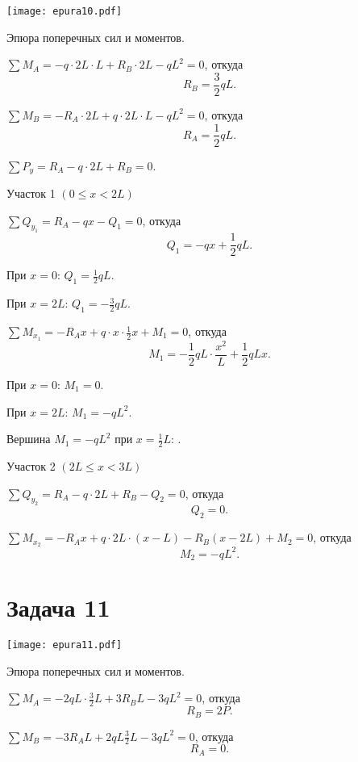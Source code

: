\begin{floatingfigure}[r]{0.5\textwidth}
    \centering
    \texttt{[image: epura10.pdf]}
    \caption{Эпюра поперечных сил и моментов.}
    \label{fig:chap1-epura10}
\end{floatingfigure}

$\sum M_A = -q \cdot 2L \cdot L + R_B \cdot 2L - qL^2 = 0$,
откуда
\[
    R_B = \frac{3}{2}qL.
\]

$\sum M_B = -R_A \cdot 2L + q \cdot 2L \cdot L - qL^2 = 0$,
откуда
\[
    R_A = \frac{1}{2}qL.
\]

$\sum P_y = R_A - q \cdot 2L + R_B = 0$.

Участок 1 $\left(0 \le x < 2L\right)$

$\sum Q_{y_1} = R_A - qx - Q_1 = 0$,
откуда
\[
    Q_1 = -qx + \frac{1}{2}qL.
\]

При $x = 0$: $Q_1 = \frac{1}{2}qL$.

При $x = 2L$: $Q_1 = -\frac{3}{2}qL$.

$\sum M_{x_1} = -R_A x + q \cdot x \cdot \frac{1}{2}x + M_1 = 0$,
откуда
\[
    M_1 = -\frac{1}{2}qL \cdot \frac{x^2}{L} + \frac{1}{2}qLx.
\]

При $x = 0$: $M_1 = 0$.

При $x = 2L$: $M_1 = -qL^2$.

Вершина $M_1 = -qL^2$ при $x = \frac{1}{2} L$: .

Участок 2 $\left(2L \le x < 3L\right)$

$\sum Q_{y_2} = R_A - q \cdot 2L + R_B - Q_2 = 0$,
откуда
\[
    Q_2 = 0.
\]

$\sum M_{x_2} = -R_A x + q \cdot 2L \cdot (x - L) - R_B (x - 2L) + M_2 = 0$,
откуда
\[
    M_2 = -qL^2.
\]

\newpage


\section{Задача 11}

\begin{floatingfigure}[r]{0.5\textwidth}
    \centering
    \texttt{[image: epura11.pdf]}
    \caption{Эпюра поперечных сил и моментов.}
    \label{fig:chap1-epura11}
\end{floatingfigure}

$\sum M_A = -2 q L \cdot \frac{3}{2} L + 3 R_B L - 3qL^2 = 0$,
откуда
\[
    R_B = 2P.
\]

$\sum M_B = -3 R_A L + 2 q L \frac{3}{2} L - 3 q L^2 = 0$,
откуда
\[
    R_A = 0.
\]

